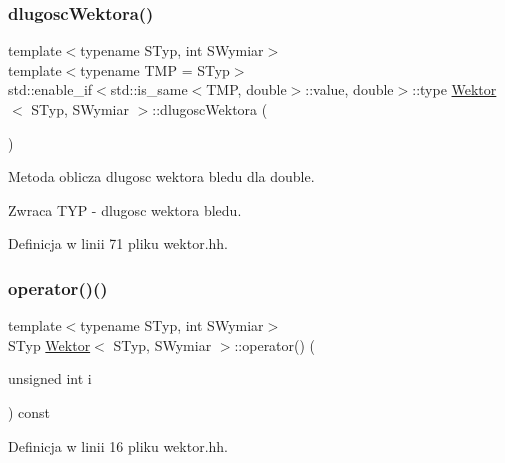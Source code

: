 \subsubsection{\texorpdfstring{dlugoscWektora()}{dlugoscWektora()}}
{\footnotesize\ttfamily template$<$typename S\+Typ, int S\+Wymiar$>$ \\
template$<$typename T\+MP  = S\+Typ$>$ \\
std\+::enable\+\_\+if$<$std\+::is\+\_\+same$<$T\+MP, double$>$\+::value, double$>$\+::type \mbox{\hyperlink{class_wektor}{Wektor}}$<$ S\+Typ, S\+Wymiar $>$\+::dlugosc\+Wektora (\begin{DoxyParamCaption}{ }\end{DoxyParamCaption})\hspace{0.3cm}{\ttfamily [inline]}}

Metoda oblicza dlugosc wektora bledu dla double.

\begin{DoxyReturn}{Zwraca}
T\+YP -\/ dlugosc wektora bledu. 
\end{DoxyReturn}


Definicja w linii 71 pliku wektor.\+hh.

\mbox{\label{class_wektor_adc3d97e60e0488778b4b9af711c0fff9}} 
\subsubsection{\texorpdfstring{operator()()}{operator()()}\hspace{0.1cm}{\footnotesize\ttfamily [1/2]}}
{\footnotesize\ttfamily template$<$typename S\+Typ, int S\+Wymiar$>$ \\
S\+Typ \mbox{\hyperlink{class_wektor}{Wektor}}$<$ S\+Typ, S\+Wymiar $>$\+::operator() (\begin{DoxyParamCaption}\item[{unsigned int}]{i }\end{DoxyParamCaption}) const\hspace{0.3cm}{\ttfamily [inline]}}



Definicja w linii 16 pliku wektor.\+hh.

\mbox{\label{class_wektor_a38743f00d800acff23b24447fecede37}} 

